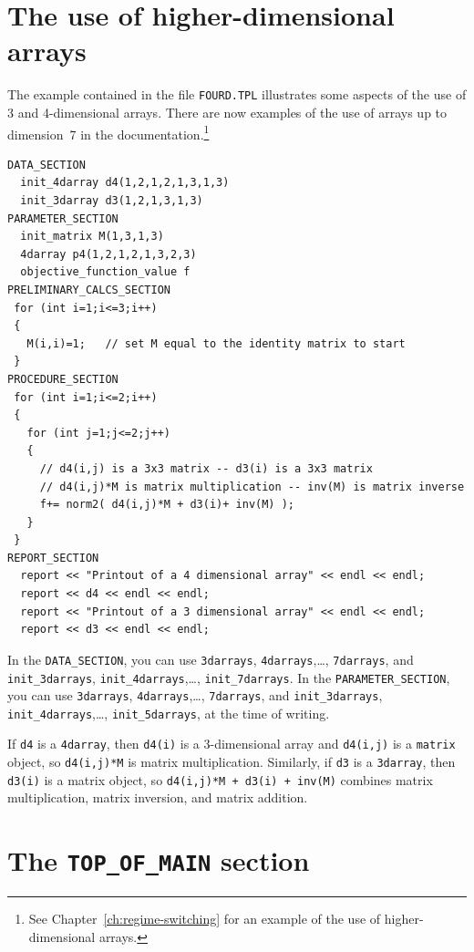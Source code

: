 \documentclass{admbmanual}
\newcommand\DS{\texttt{DATA\_SECTION}}
\newcommand\PS{\texttt{PARAMETER\_SECTION}}
\begin{document}
\section{The use of higher-dimensional arrays}

The example contained in the file
\texttt{FOURD.TPL} illustrates some aspects of the use of 3 and 4-dimensional 
arrays. There are now examples of the use of arrays
up to dimension~7 in the documentation.\footnote{See Chapter~\ref{ch:regime-switching} 
for an example of the use of higher-dimensional arrays.}
\begin{lstlisting} 
DATA_SECTION
  init_4darray d4(1,2,1,2,1,3,1,3)
  init_3darray d3(1,2,1,3,1,3)
PARAMETER_SECTION
  init_matrix M(1,3,1,3) 
  4darray p4(1,2,1,2,1,3,2,3)
  objective_function_value f
PRELIMINARY_CALCS_SECTION
 for (int i=1;i<=3;i++)
 {
   M(i,i)=1;   // set M equal to the identity matrix to start
 } 
PROCEDURE_SECTION
 for (int i=1;i<=2;i++)
 {
   for (int j=1;j<=2;j++)
   {
     // d4(i,j) is a 3x3 matrix -- d3(i) is a 3x3 matrix 
     // d4(i,j)*M is matrix multiplication -- inv(M) is matrix inverse
     f+= norm2( d4(i,j)*M + d3(i)+ inv(M) );
   }
 }
REPORT_SECTION
  report << "Printout of a 4 dimensional array" << endl << endl;
  report << d4 << endl << endl;
  report << "Printout of a 3 dimensional array" << endl << endl;
  report << d3 << endl << endl;
\end{lstlisting}
In the \DS, you can use \texttt{3darrays}, \texttt{4darrays},\ldots, \texttt{7darrays}, and
\texttt{init\_3darrays}, \texttt{init\_4darrays},\ldots, \texttt{init\_7darrays}.
In the \PS, you can use \texttt{3darrays}, \texttt{4darrays},\ldots, \texttt{7darrays},
and  \texttt{init\_3darrays}, \texttt{init\_4darrays},\ldots, \texttt{init\_5darrays},
at the time of writing. 

If \texttt{d4} is a \texttt{4darray}, then 
\texttt{d4(i)} is a 3-dimensional array and \texttt{d4(i,j)} is a \texttt{matrix}
object, so \texttt{d4(i,j)*M} is matrix multiplication. Similarly,
if \texttt{d3} is a \texttt{3darray}, then \texttt{d3(i)} is a matrix object,
so \texttt{d4(i,j)*M + d3(i) + inv(M)} combines matrix multiplication,
matrix inversion, and matrix addition.



\section{The \texttt{TOP\_OF\_MAIN} section}
\end{document}
